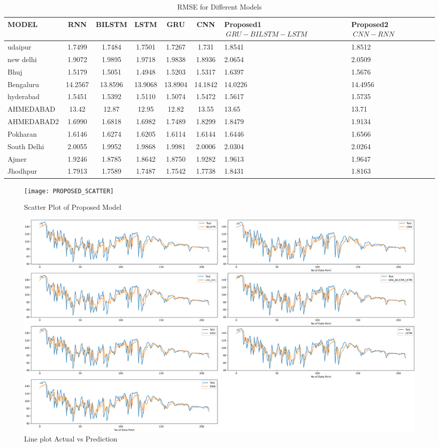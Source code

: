 \documentclass[a4paper,fleqn]{cas-sc}
\begin{document}
\begin{table}[!ht]
\centering
\caption{RMSE for Different Models}
\begin{tabular}{|l|c|c|c|c|c|p{}|p{}|}
\hline
\textbf{MODEL} & \textbf{RNN} & \textbf{BILSTM} & \textbf{LSTM} & \textbf{GRU} & \textbf{CNN} &\textbf{Proposed1 \(\ GRU-BILSTM-LSTM \)\ } & \textbf{Proposed2 \(\ CNN-RNN\)\ } \\ \hline
udaipur & 1.7499 & 1.7484 & 1.7501 & 1.7267 & 1.731 & 1.8541 & 1.8512 \\ \hline
new delhi & 1.9072 & 1.9895 & 1.9718 & 1.9838 & 1.8936 & 2.0654 & 2.0509 \\ \hline
Bhuj & 1.5179 & 1.5051 & 1.4948 & 1.5203 & 1.5317 & 1.6397 & 1.5676 \\ \hline
Bengaluru & 14.2567 & 13.8596 & 13.9068 & 13.8904 & 14.1842 & 14.0226 & 14.4956 \\ \hline
hyderabad & 1.5451 & 1.5392 & 1.5110 & 1.5074 & 1.5472 & 1.5617 & 1.5735 \\ \hline
AHMEDABAD & 13.42 & 12.87 & 12.95 & 12.82 & 13.55 & 13.65 & 13.71 \\ \hline
AHMEDABAD2 & 1.6990 & 1.6818 & 1.6982 & 1.7489 & 1.8299 & 1.8479 & 1.9134 \\ \hline
Pokharan & 1.6146 & 1.6274 & 1.6205 & 1.6114 & 1.6144 & 1.6446 & 1.6566 \\ \hline
South Delhi & 2.0055 & 1.9952 & 1.9868 & 1.9981 & 2.0006 & 2.0304 & 2.0264 \\ \hline
Ajmer & 1.9246 & 1.8785 & 1.8642 & 1.8750 & 1.9282 & 1.9613 & 1.9647 \\ \hline
Jhodhpur & 1.7913 & 1.7589 & 1.7487 & 1.7542 & 1.7738 & 1.8431 & 1.8163 \\ \hline
\end{tabular}
\end{table}



\begin{figure}[!ht]
\centering
\texttt{[image: PROPOSED\_SCATTER]}
\caption{Scatter Plot of Proposed Model}
\label{fig:Line plot}
\end{figure}


\begin{figure}[!ht]
\centering
\includegraphics[width=\textwidth]{AHMEDABAD_act vs pred}
\caption{Line plot Actual vs Prediction}
\label{fig:Line plot}
\end{figure}
\end{document}
